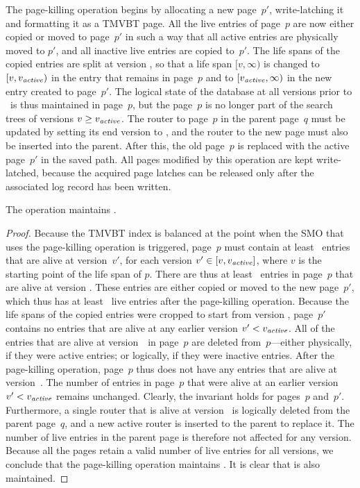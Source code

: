 The page-killing operation begins by allocating a new page~$p'$,
write-latching it and formatting it as a TMVBT page. 
All the live entries of page~$p$ are now either copied or moved to page~$p'$
in such a way that all active entries are physically moved to $p'$, and 
all inactive live entries are copied to~$p'$. 
The life spans of the copied entries are split at version
\actver, so that a life span $[v, \infty)$ is changed to $[v,
\smash{v_{\text{\textit{active}}}})$ in the entry that remains in page~$p$ and to $[\smash{v_{\text{\textit{active}}}}, \infty)$
in the new entry created to page~$p'$. 
The logical state of the database at all versions prior to \actver\ is thus
maintained in page~$p$, but the page~$p$ is no longer part of the
search trees of versions $v \geq \smash{v_{\text{\textit{active}}}}$. 
The router to page~$p$ in the parent page~$q$ must be updated by setting its
end version to \actver, and the router to the new page must also be inserted
into the parent. 
After this, the old page~$p$ is replaced with the active page~$p'$ in
the saved path. 
All pages modified by this operation are kept write-latched, because the
acquired page latches can be released only after the associated log record
has been written. 

\thmskip
\begin{lemma}
\label{lemma:kill-page-split-counts}
The  operation maintains .
\end{lemma}
\begin{proof}
Because the TMVBT index is balanced at the point when the SMO that uses the
page-killing operation is triggered, page~$p$ must contain at least \minlive\
entries that are alive at version~$v'$, for each version $v' \in [v,
\smash{v_{\text{\textit{active}}}}]$, where $v$ is the starting point of the life span of $p$. 
There are thus at least \minlive\ entries in page~$p$ that are alive at
version \actver. 
These entries are either copied or moved to the new page~$p'$, which thus has
at least \minlive\ live entries after the page-killing operation.
Because the life spans of the copied entries were cropped to start from
version \actver, page~$p'$ contains no entries that are alive at any
earlier version $v' < \smash{v_{\text{\textit{active}}}}$.
All of the entries that are alive at version~\actver\ in page~$p$ are 
deleted from~$p$---either physically, if they were active entries; or
logically, if they were inactive entries.
After the page-killing operation, page~$p$ thus does not have any entries that
are alive at version~\actver.
The number of entries in page~$p$ that were alive at an earlier version $v' <
\smash{v_{\text{\textit{active}}}}$ remains unchanged. 
Clearly, the invariant holds for pages~$p$ and~$p'$.
Furthermore, a single router that is alive at version \actver\ is logically
deleted from the parent page~$q$, and a new active router is inserted to the
parent to replace it. 
The number of live entries in the parent page is therefore not affected for
any version.
Because all the pages retain a valid number of live entries for all
versions, we conclude that the page-killing operation maintains
.
It is clear that  is also
maintained.
\end{proof}
\thmskip

